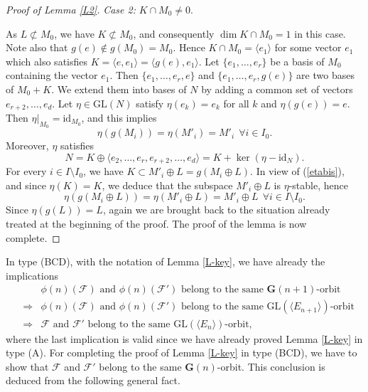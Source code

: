 \documentclass[12pt]{amsart}
\newcommand{\GL}{\mathrm{GL}}
\newcommand{\G}{\mathbf{G}}
\newcommand{\Ff}{\mathcal{F}}
\renewcommand{\span}[1]{\langle #1\rangle}
\numberwithin{equation}{section}
\theoremstyle{definition}
\begin{document}
\begin{proof}[Proof of Lemma \ref{L2}]
\medskip
\noindent
{\it Case 2:} $K\cap M_0\not=0$.

As $L\not\subset M_0$, we have $K\not\subset M_0$, and consequently $\dim K\cap M_0=1$ in this case.
Note also that $g(e)\notin g(M_0)=M_0$. Hence $K\cap M_0=\span{e_1}$ for some vector $e_1$ which also satisfies $K=\span{e,e_1}=\span{g(e),e_1}$. Let $\{e_1,\ldots,e_r\}$ be a basis of $M_0$ containing the vector $e_1$. Then $\{e_1,\ldots,e_r,e\}$ and $\{e_1,\ldots,e_r,g(e)\}$ are two bases of $M_0+K$. We extend them into bases of $N$ by adding a common set of vectors $e_{r+2},\ldots,e_{d}$. Let $\eta\in\mathrm{GL}(N)$ satisfy $\eta(e_k)=e_k$ for all $k$ and $\eta(g(e))=e$. Then $\eta|_{M_0}=\mathrm{id}_{M_0}$, and this implies
\[\eta(g(M_i))=\eta(M'_i)=M'_i\ \ \forall i\in I_0.\]
Moreover, $\eta$ satisfies
\begin{equation}
\label{etabis}
N=K\oplus \span{e_2,\ldots,e_r,e_{r+2},\ldots,e_{d}}=K+\ker (\eta-\mathrm{id}_{N}).
\end{equation}
For every $i\in I\setminus I_0$,
we have $K\subset M'_i\oplus L=g(M_i\oplus L)$. In view of (\ref{etabis}), and since $\eta(K)=K$, we deduce that
the subspace $M'_i\oplus L$ is $\eta$-stable, hence
\[\eta(g(M_i\oplus L))=\eta(M'_i\oplus L)=M'_i\oplus L\ \ \forall i\in I\setminus I_0.\]
Since $\eta(g(L))=L$, again we are brought back to the situation already treated at the beginning of the proof. The proof of the lemma is now complete.
\end{proof}



In type (BCD), with the notation of Lemma \ref{L-key}, we have already the implications
\begin{eqnarray*}
& & \mbox{$\phi(n)(\Ff)$ and $\phi(n)(\Ff')$ belong to the same $\G(n+1)$-orbit} \\
& \Rightarrow & \mbox{$\phi(n)(\Ff)$ and $\phi(n)(\Ff')$ belong to the same $\GL(\span{E_{n+1}})$-orbit} \\
& \Rightarrow & \mbox{$\Ff$ and $\Ff'$ belong to the same $\GL(\span{E_n})$-orbit,}
\end{eqnarray*}
where the last implication is valid since we have already proved Lemma \ref{L-key} in type (A).
For completing the proof of Lemma \ref{L-key} in type (BCD), we have to show that $\Ff$ and $\Ff'$ belong to the same $\G(n)$-orbit.
This conclusion is deduced from the following general fact.
\end{document}

